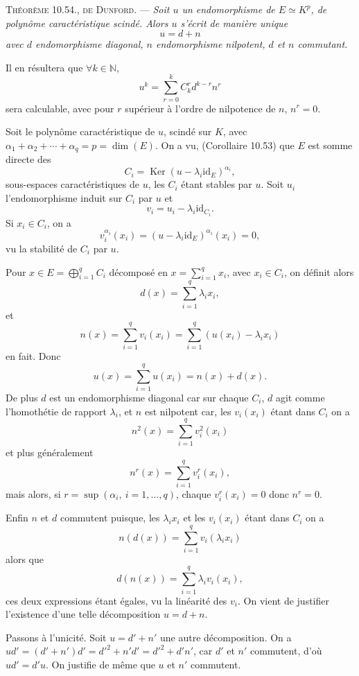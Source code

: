 \medskip\noindent\textsc{Théorème 10.54., de Dunford.} --- \emph{Soit $u$ un endomorphisme de $E\simeq K^p$, de polynôme caractéristique scindé. Alors $u$ s'écrit de manière unique
\[
u=d+n
\]
avec $d$ endomorphisme diagonal, $n$ endomorphisme nilpotent, $d$ et $n$ commutant.}

Il en résultera que $\forall k\in\mathbb N$,
\[
u^k=\sum_{r=0}^k C_k^r d^{k-r}n^r
\]
sera calculable, avec pour $r$ supérieur à l'ordre de nilpotence de $n$, $n^r=0$.

Soit
le polynôme caractéristique de $u$, scindé sur $K$, avec $\alpha_1+\alpha_2+\cdots+\alpha_q=p=\dim(E)$. On a vu, (Corollaire 10.53) que $E$ est somme directe des
\[
C_i=\operatorname{Ker}(u-\lambda_i\mathrm{id}_E)^{\alpha_i},
\]
sous-espaces caractéristiques de $u$, les $C_i$ étant stables par $u$. Soit $u_i$ l'endomorphisme induit sur $C_i$ par $u$ et
\[
v_i=u_i-\lambda_i\mathrm{id}_{C_i}.
\]
Si $x_i\in C_i$, on a
\[
v_i^{\alpha_i}(x_i)=(u-\lambda_i\mathrm{id}_E)^{\alpha_i}(x_i)=0,
\]
vu la stabilité de $C_i$ par $u$.

Pour $x\in E=\bigoplus_{i=1}^qC_i$ décomposé en $x=\sum_{i=1}^q x_i$, avec $x_i\in C_i$, on définit alors
\[
d(x)=\sum_{i=1}^q\lambda_i x_i,
\]
et
\[
n(x)=\sum_{i=1}^qv_i(x_i)=\sum_{i=1}^q(u(x_i)-\lambda_i x_i)
\]
en fait.
Donc
\[
u(x)=\sum_{i=1}^q u(x_i)=n(x)+d(x).
\]
De plus $d$ est un endomorphisme diagonal car sur chaque $C_i$, $d$ agit comme l'homothétie de rapport $\lambda_i$, et $n$ est nilpotent car, les $v_i(x_i)$ étant dans $C_i$ on a
\[
n^2(x)=\sum_{i=1}^qv_i^2(x_i)
\]
et plus généralement
\[
n^r(x)=\sum_{i=1}^qv_i^r(x_i),
\]
mais alors, si $r=\sup(\alpha_i,\ i=1,\ldots,q)$, chaque $v_i^r(x_i)=0$ donc $n^r=0$.

Enfin $n$ et $d$ commutent puisque, les $\lambda_ix_i$ et les $v_i(x_i)$ étant dans $C_i$ on a
\[
n(d(x))=\sum_{i=1}^qv_i(\lambda_i x_i)
\]
alors que
\[
d(n(x))=\sum_{i=1}^q\lambda_iv_i(x_i),
\]
ces deux expressions étant égales, vu la linéarité des $v_i$.
On vient de justifier l'existence d'une telle décomposition $u=d+n$.

Passons à l'unicité. Soit $u=d'+n'$ une autre décomposition.
On a $ud'=(d'+n')d'=d'^2+n'd'=d'^2+d'n'$, car $d'$ et $n'$ commutent, d'où $ud'=d'u$. On justifie de même que $u$ et $n'$ commutent.

